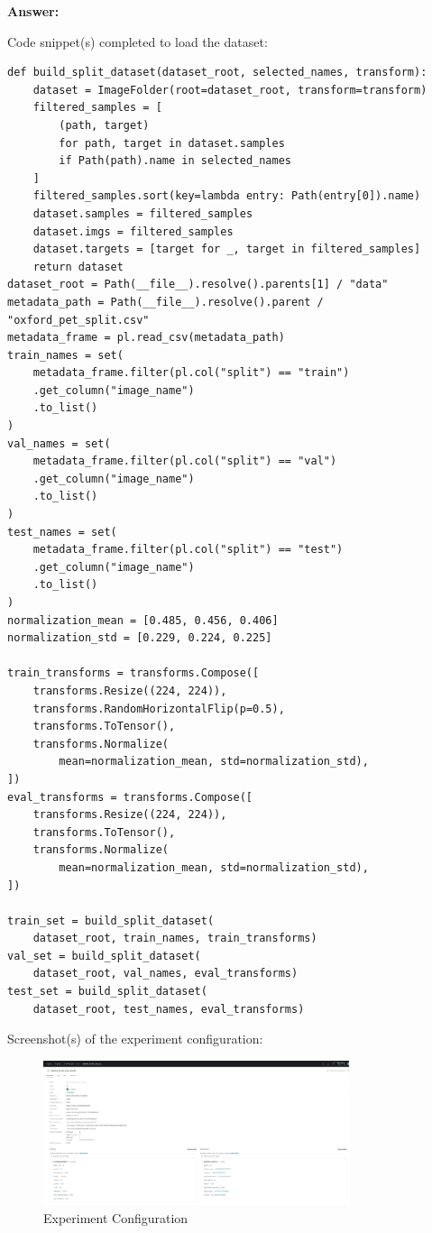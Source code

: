 \documentclass[11pt, oneside]{article}   	%
\begin{document}
\begin{answerbox} \textbf{Answer:} \vspace*{1cm}

    Code snippet(s) completed to load the dataset:
\begin{verbatim}
def build_split_dataset(dataset_root, selected_names, transform):
    dataset = ImageFolder(root=dataset_root, transform=transform)
    filtered_samples = [
        (path, target)
        for path, target in dataset.samples
        if Path(path).name in selected_names
    ]
    filtered_samples.sort(key=lambda entry: Path(entry[0]).name)
    dataset.samples = filtered_samples
    dataset.imgs = filtered_samples
    dataset.targets = [target for _, target in filtered_samples]
    return dataset
dataset_root = Path(__file__).resolve().parents[1] / "data"
metadata_path = Path(__file__).resolve().parent / "oxford_pet_split.csv"
metadata_frame = pl.read_csv(metadata_path)
train_names = set(
    metadata_frame.filter(pl.col("split") == "train")
    .get_column("image_name")
    .to_list()
)
val_names = set(
    metadata_frame.filter(pl.col("split") == "val")
    .get_column("image_name")
    .to_list()
)
test_names = set(
    metadata_frame.filter(pl.col("split") == "test")
    .get_column("image_name")
    .to_list()
)
normalization_mean = [0.485, 0.456, 0.406]
normalization_std = [0.229, 0.224, 0.225]

train_transforms = transforms.Compose([
    transforms.Resize((224, 224)),
    transforms.RandomHorizontalFlip(p=0.5),
    transforms.ToTensor(),
    transforms.Normalize(
        mean=normalization_mean, std=normalization_std),
])
eval_transforms = transforms.Compose([
    transforms.Resize((224, 224)),
    transforms.ToTensor(),
    transforms.Normalize(
        mean=normalization_mean, std=normalization_std),
])

train_set = build_split_dataset(
    dataset_root, train_names, train_transforms)
val_set = build_split_dataset(
    dataset_root, val_names, eval_transforms)
test_set = build_split_dataset(
    dataset_root, test_names, eval_transforms)
\end{verbatim}

Screenshot(s) of the experiment configuration:

\begin{figure}[h]
    \centering
    \includegraphics[width=0.8\textwidth]{images/experiment_configuration.png}
    \caption{Experiment Configuration}
\end{figure}


\end{answerbox}
\end{document}
